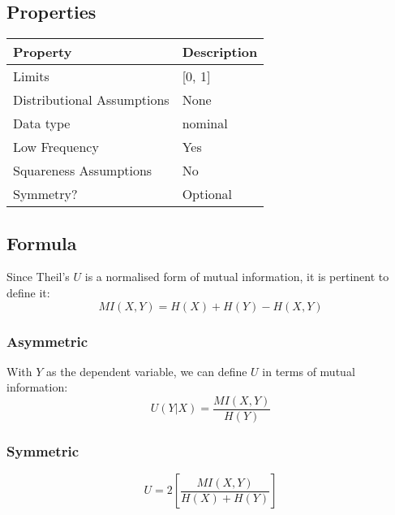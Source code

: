 \documentclass[11pt]{article}
\begin{document}

\subsection{Properties}
\begin{tabular}{| l || l |}
    \hline
    {\bf Property} & {\bf Description} \\
    \hline
    Limits & [0, 1] \\ \hline

    Distributional Assumptions& None \\ \hline

    Data type & nominal \\ \hline

    Low Frequency & Yes \\ \hline

    Squareness Assumptions & No \\ \hline
    
    Symmetry? & Optional \\ \hline

\end{tabular}


\subsection{Formula}
Since Theil's $U$ is a normalised form of mutual information, it is pertinent to define it:
$$
MI(X,Y) = H(X) + H(Y) - H(X, Y)
$$

\subsubsection{Asymmetric}
With $Y$ as the dependent variable, we can define $U$ in terms of mutual information:
$$
U(Y|X) = \frac{ MI(X,Y) }{ H(Y) }
$$

\subsubsection{Symmetric}
$$
U = 2 \left[ \frac{ MI(X,Y) }{ H(X) + H(Y) } \right]
$$
\end{document}
